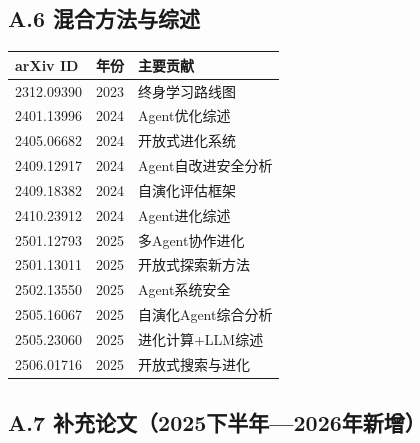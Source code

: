 \subsection*{A.6 混合方法与综述}

\begin{longtable}{llp{7cm}}
\toprule
\textbf{arXiv ID} & \textbf{年份} & \textbf{主要贡献} \\
\midrule
2312.09390 & 2023 & 终身学习路线图 \\
2401.13996 & 2024 & Agent优化综述 \\
2405.06682 & 2024 & 开放式进化系统 \\
2409.12917 & 2024 & Agent自改进安全分析 \\
2409.18382 & 2024 & 自演化评估框架 \\
2410.23912 & 2024 & Agent进化综述 \\
2501.12793 & 2025 & 多Agent协作进化 \\
2501.13011 & 2025 & 开放式探索新方法 \\
2502.13550 & 2025 & Agent系统安全 \\
2505.16067 & 2025 & 自演化Agent综合分析 \\
2505.23060 & 2025 & 进化计算+LLM综述 \\
2506.01716 & 2025 & 开放式搜索与进化 \\
\bottomrule
\end{longtable}

\subsection*{A.7 补充论文（2025下半年—2026年新增）}

